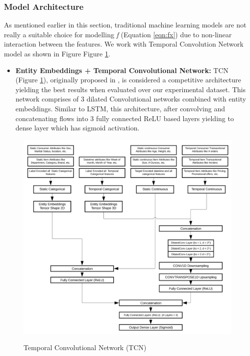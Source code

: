 \subsubsection{Model Architecture}
As mentioned earlier in this section, traditional machine learning models are not really a suitable choice for modelling \emph{f} 
(Equation \ref{eqn:fx}) due to non-linear interaction between the features.
We work with Temporal Convolution Network model as shown in Figure Figure \ref{fig:TCN}.
\begin{itemize}
\item {\bf Entity Embeddings + Temporal Convolutional Network:} TCN (Figure \ref{fig:TCN}), originally
proposed in \cite{lea2016temporal} , is considered a competitive architecture yielding the best results when evaluated over 
our experimental dataset. This network comprises of 3 dilated Convolutional networks combined with entity embeddings.
Similar to LSTM, this architecture, after convolving and concatenating flows into 
3 fully connected ReLU based layers yielding to dense layer which has sigmoid activation.
\end{itemize}
  \begin{figure}[t]
    \centering 
    \caption{Temporal Convolutional Network (TCN)} 
    \includegraphics[width=5.5in]{img/TCN.png} 
    \label{fig:TCN} 
  \end{figure}
